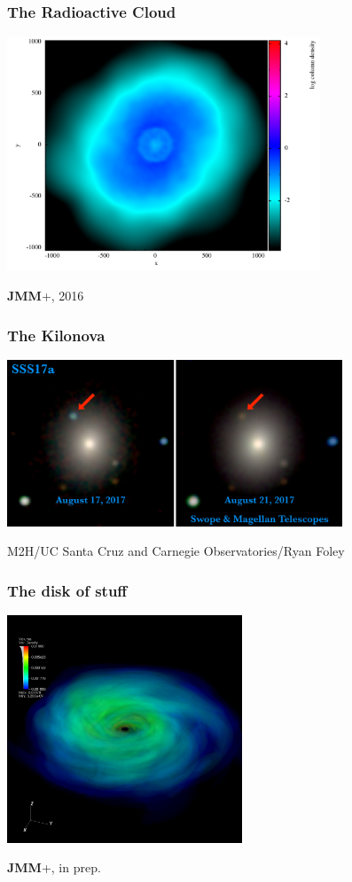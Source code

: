 \documentclass[]{beamer}
\begin{document}
\begin{frame}
  \frametitle{The Radioactive Cloud}
  \begin{center}
    \includegraphics[height=7cm,clip,trim={4cm 1.5cm 4cm 0cm}]
      {ejecta-morphology-z-projection}
  \end{center}
  \textbf{JMM}+, 2016
\end{frame}

\begin{frame}
  \frametitle{The Kilonova}
  \begin{center}
    \includegraphics[width=10cm]{swope-image}
  \end{center}
  M2H/UC Santa Cruz and Carnegie Observatories/Ryan Foley
\end{frame}

\begin{frame}
  \frametitle{The disk of stuff}
  \begin{center}
    \includegraphics[width=7cm]{disk_3d_render}
  \end{center}
  \textbf{JMM}+, in prep.
\end{frame}
\end{document}
